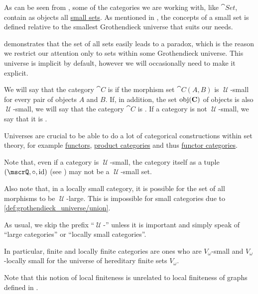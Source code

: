 \begin{definition}\label{def:category_size}
  As can be seen from , some of the categories we are working with, like \( \cat{Set} \), contain as objects all \hyperref[def:large_and_small_sets]{small sets}. As mentioned in , the concepts of a small set is defined relative to the smallest Grothendieck universe that suits our needs.

   demonstrates that the set of all sets easily leads to a paradox, which is the reason we restrict our attention only to sets within some Grothendieck universe. This universe is implicit by default, however we will occasionally need to make it explicit.

  We will say that the category \( \cat{C} \) is  if the morphism set \( \cat{C}(A, B) \) is \( \mscrU \)-small for every pair of objects \( A \) and \( B \). If, in addition, the set \( \operatorname{obj}(\operatorname{\mathbf{C}}) \) of objects is also \( \mscrU \)-small, we will say that the category \( \cat{C} \) is . If a category is not \( \mscrU \)-small, we say that it is .

  Universes are crucial to be able to do a lot of categorical constructions within set theory, for example \hyperref[def:functors]{functors}, \hyperref[def:product_category]{product categories} and thus \hyperref[def:functor_category]{functor categories}.

  Note that, even if a category is \( \mscrU \)-small, the category itself as a tuple \( (\mscrQ, \bincirc, \id) \) (see ) may not be a \( \mscrU \)-small set.

  Also note that, in a locally small category, it is possible for the set of all morphisms to be \( \mscrU \)-large. This is impossible for small categories due to \ref{def:grothendieck_universe/union}.

  As usual, we skip the prefix \enquote{\( \mscrU \)-} unless it is important and simply speak of \enquote{large categories} or \enquote{locally small categories}.

  In particular, finite and locally finite categories are ones who are \( V_\omega \)-small and \( V_\omega \)-locally small for the universe of hereditary finite sets \hyperref[def:universe_of_hereditary_finite_sets]{\( V_\omega \)}.

  Note that this notion of local finiteness is unrelated to local finiteness of graphs defined in .
\end{definition}

